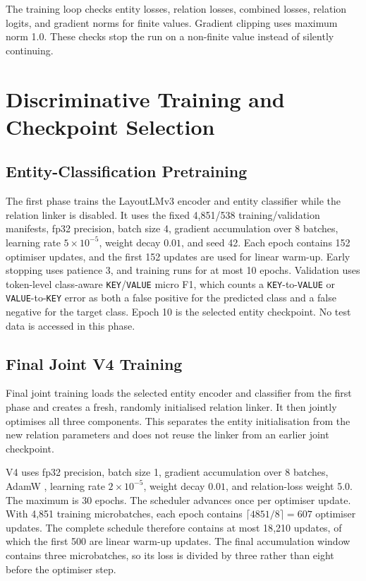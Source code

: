 The training loop checks entity losses, relation losses, combined losses,
relation logits, and gradient norms for finite values. Gradient clipping uses
maximum norm 1.0. These checks stop the run on a non-finite value instead of
silently continuing.

\section{Discriminative Training and Checkpoint Selection}
\label{sec:training-pipeline}

\subsection{Entity-Classification Pretraining}
\label{sec:stage4-training-loop}

The first phase trains the LayoutLMv3 encoder and entity classifier while the
relation linker is disabled. It uses the fixed 4{,}851/538
training/validation manifests, fp32 precision, batch size 4, gradient
accumulation over 8 batches, learning rate $5\times10^{-5}$, weight decay
$0.01$, and seed 42. Each epoch contains 152 optimiser updates, and the first
152 updates are used for linear warm-up. Early stopping uses patience 3, and
training runs for at most 10 epochs. Validation uses
token-level class-aware \texttt{KEY}/\texttt{VALUE} micro F1, which counts a
\texttt{KEY}-to-\texttt{VALUE} or \texttt{VALUE}-to-\texttt{KEY} error as both
a false positive for the predicted class and a false negative for the target
class. Epoch 10 is the selected entity checkpoint. No test data is accessed in
this phase.

\subsection{Final Joint V4 Training}
\label{sec:v4-joint-training}

Final joint training loads the selected entity encoder and classifier from the
first phase and creates a fresh, randomly initialised relation linker. It then jointly optimises
all three components. This separates the entity initialisation from the new
relation parameters and does not reuse the linker from an earlier joint
checkpoint.

V4 uses fp32 precision, batch size 1, gradient accumulation over 8 batches,
AdamW \cite{loshchilov2019decoupled}, learning rate $2\times10^{-5}$, weight
decay $0.01$, and relation-loss weight 5.0. The maximum is 30 epochs. The
scheduler advances once per optimiser update. With 4{,}851 training
microbatches, each epoch contains
$\lceil 4851/8\rceil=607$ optimiser updates. The complete schedule therefore
contains at most 18{,}210 updates, of which the first 500 are linear warm-up
updates. The final accumulation window contains three microbatches, so its loss
is divided by three rather than eight before the optimiser step.

